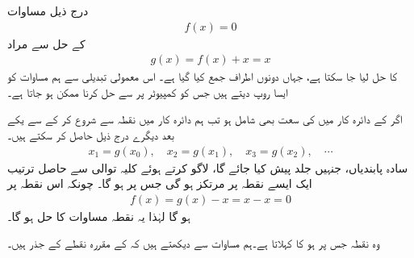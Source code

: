 درج ذیل مساوات 
\begin{align}\label{مساوات_ترتیب_پکاغ_الف}
f(x)=0
\end{align}
کے حل سے مراد 
\begin{align}\label{مساوات_ترتیب_پکاغ_ب}
g(x)=f(x)+x=x
\end{align}
کا حل لیا جا سکتا ہے،  جہاں دونوں اطراف  جمع کیا گیا ہے۔ اس معمولی تبدیلی  سے ہم   مساوات   کو ایسا روپ دیتے ہیں جس کو  کمپیوٹر پر    سے حل کرنا ممکن ہو جاتا ہے۔

اگر  کے دائرہ کار میں  کی سعت بھی شامل ہو تب ہم دائرہ کار میں نقطہ  سے شروع کر کے  سے یکے بعد دیگرے  درج ذیل حاصل کر سکتے  ہیں۔
\begin{align}\label{مساوات_ترتیب_پکاغ_پ}
x_1=g(x_0),\quad x_2=g(x_1),\quad x_3=g(x_2),\quad \cdots
\end{align} 
سادہ پابندیاں، جنہیں جلد پیش کیا جائے گا، لاگو کرتے ہوئے کلیہ توالی  سے حاصل ترتیب ایک ایسے نقطہ  پر  مرتکز ہو گی جس پر  ہو گا۔ چونکہ اس نقطہ پر
\begin{align}\label{مساوات_ترتیب_پکاغ_ت}
f(x)=g(x)-x=x-x=0
\end{align}
ہو گا لہٰذا یہ نقطہ مساوات  کا حل ہو گا۔

وہ نقطہ جس پر  ہو  کا  کہلاتا ہے۔ہم مساوات  سے دیکھتے ہیں کہ  کے مقررہ نقطے  کے جذر ہیں۔

